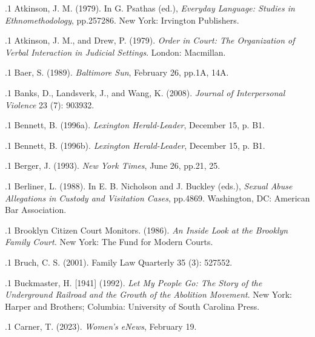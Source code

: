 \documentclass[11pt, twoside]{article}
\begin{document}
{\p.1{%
Atkinson, J. M. (1979). 
In G. Psathas (ed.), \textit{Everyday Language: Studies in Ethnomethodology},
pp.\@ 257\ndash{}286. New York: Irvington Publishers.
}%

\p.1{%
Atkinson, J. M., and Drew, P. (1979). \textit{Order in Court: The Organization of Verbal
Interaction in Judicial Settings}. London: Macmillan.
}%

\p.1{%
Baer, S. (1989). 
\textit{Baltimore Sun}, February 26, pp.\@ 1A, 14A.
}%

\p.1{%
Banks, D., Landsverk, J., and Wang, K. (2008).  \textit{Journal of Interpersonal Violence} 23 (7): 903\ndash{}932.
}%

\p.1{%
Bennett, B. (1996a).  \textit{Lexington
Herald-Leader}, December 15, p. B1.
}%

\p.1{%
Bennett, B. (1996b).  \textit{Lexington
Herald-Leader}, December 15, p. B1.
}%

\p.1{%
Berger, J. (1993).  \textit{New York Times},
June 26, pp.\@ 21, 25.
}%

\p.1{%
Berliner, L. (1988).  In E. B.
Nicholson and J. Buckley (eds.), \textit{Sexual Abuse Allegations in Custody and Visitation
Cases}, pp.\@ 48\ndash{}69. Washington, DC: American Bar Association.
}%

\p.1{%
Brooklyn Citizen Court Monitors. (1986). \textit{An Inside Look at the Brooklyn Family
Court.} New York: The Fund for Modern Courts.
}%

\p.1{%
Bruch, C. S. (2001).  Family Law Quarterly 35 (3): 527\ndash{}552.
}%

\p.1{%
Buckmaster, H. [1941] (1992). \textit{Let My People Go: The Story of the Underground
Railroad and the Growth of the Abolition Movement}. New York: Harper and
Brothers; Columbia: University of South Carolina Press.
}%

\p.1{%
Carner, T. (2023).  \textit{Women’s eNews}, February 19.
}%

}
\end{document}
